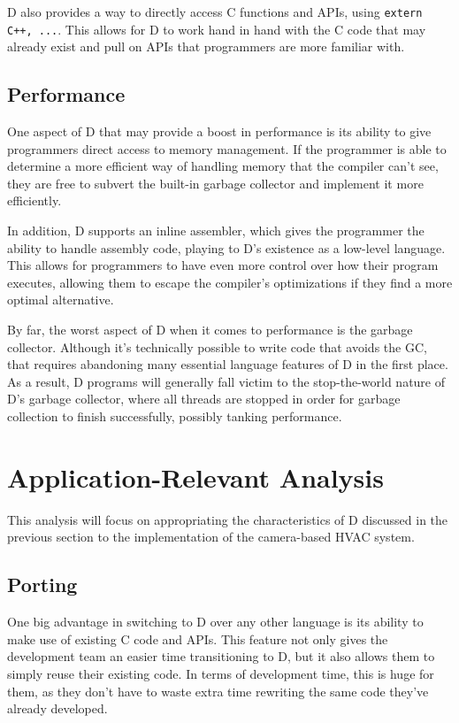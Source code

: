 \par
D also provides a way to directly access C functions and APIs, using
\texttt{extern C++, ...}. This allows for D to work hand in hand with the
C code that may already exist and pull on APIs that programmers are more
familiar with.

\subsection{Performance}
One aspect of D that may provide a boost in performance is its ability to
give programmers direct access to memory management. If the programmer is able
to determine a more efficient way of handling memory that the compiler can't
see, they are free to subvert the built-in garbage collector and implement it
more efficiently.
\par
In addition, D supports an inline assembler, which gives the programmer the
ability to handle assembly code, playing to D's existence as a low-level
language. This allows for programmers to have even more control over how their
program executes, allowing them to escape the compiler's optimizations if they
find a more optimal alternative.
\par
By far, the worst aspect of D when it comes to performance is the garbage
collector. Although it's technically possible to write code that avoids the GC,
that requires abandoning many essential language features of D in the first
place. As a result, D programs will generally fall victim to the stop-the-world
nature of D's garbage collector, where all threads are stopped in order for
garbage collection to finish successfully, possibly tanking performance.

\section{Application-Relevant Analysis}
\par
This analysis will focus on appropriating the characteristics of D discussed in
the previous section to the implementation of the camera-based HVAC system.

\subsection{Porting}
One big advantage in switching to D over any other language is its ability to
make use of existing C code and APIs. This feature not only gives the
development team an easier time transitioning to D, but it also allows them to
simply reuse their existing code. In terms of development time, this is huge for
them, as they don't have to waste extra time rewriting the same code they've
already developed.

